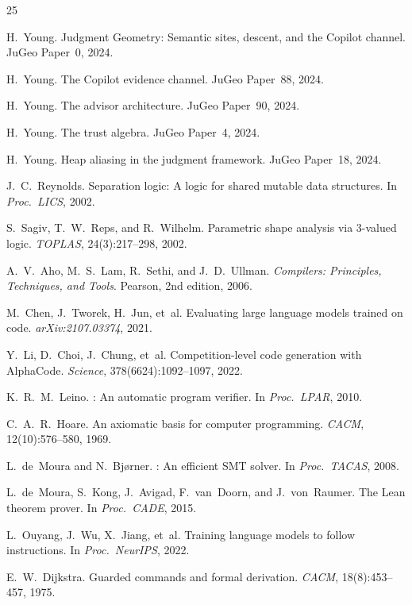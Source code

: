 \documentclass[11pt]{article}
\begin{document}
\begin{thebibliography}{25}

H.~Young.
\newblock Judgment Geometry: Semantic sites, descent, and the Copilot channel.
\newblock JuGeo Paper~0, 2024.

H.~Young.
\newblock The Copilot evidence channel.
\newblock JuGeo Paper~88, 2024.

H.~Young.
\newblock The advisor architecture.
\newblock JuGeo Paper~90, 2024.

H.~Young.
\newblock The trust algebra.
\newblock JuGeo Paper~4, 2024.

H.~Young.
\newblock Heap aliasing in the judgment framework.
\newblock JuGeo Paper~18, 2024.

J.~C.~Reynolds.
\newblock Separation logic: A logic for shared mutable data structures.
\newblock In \emph{Proc.\ LICS}, 2002.

S.~Sagiv, T.~W.~Reps, and R.~Wilhelm.
\newblock Parametric shape analysis via 3-valued logic.
\newblock \emph{TOPLAS}, 24(3):217--298, 2002.

A.~V.~Aho, M.~S.~Lam, R.~Sethi, and J.~D.~Ullman.
\newblock \emph{Compilers: Principles, Techniques, and Tools}.
\newblock Pearson, 2nd edition, 2006.

M.~Chen, J.~Tworek, H.~Jun, et~al.
\newblock Evaluating large language models trained on code.
\newblock \emph{arXiv:2107.03374}, 2021.

Y.~Li, D.~Choi, J.~Chung, et~al.
\newblock Competition-level code generation with {AlphaCode}.
\newblock \emph{Science}, 378(6624):1092--1097, 2022.

K.~R.~M.~Leino.
: An automatic program verifier.
\newblock In \emph{Proc.\ LPAR}, 2010.

C.~A.~R.~Hoare.
\newblock An axiomatic basis for computer programming.
\newblock \emph{CACM}, 12(10):576--580, 1969.

L.~de~Moura and N.~Bj{\o}rner.
: An efficient {SMT} solver.
\newblock In \emph{Proc.\ TACAS}, 2008.

L.~de~Moura, S.~Kong, J.~Avigad, F.~van~Doorn, and J.~von~Raumer.
\newblock The {Lean} theorem prover.
\newblock In \emph{Proc.\ CADE}, 2015.

L.~Ouyang, J.~Wu, X.~Jiang, et~al.
\newblock Training language models to follow instructions.
\newblock In \emph{Proc.\ NeurIPS}, 2022.

E.~W.~Dijkstra.
\newblock Guarded commands and formal derivation.
\newblock \emph{CACM}, 18(8):453--457, 1975.

\end{thebibliography}
\end{document}
